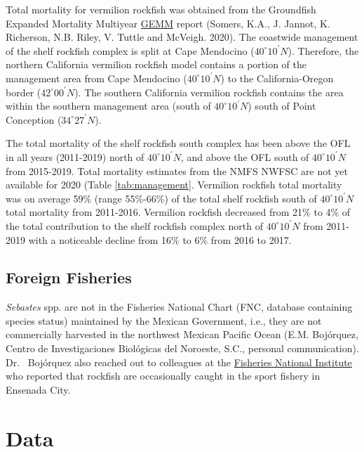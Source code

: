 \documentclass[
  english,
  a4paper,
]{article}
\begin{document}
Total mortality for vermilion rockfish was obtained from the Groundfish Expanded Mortality
Multiyear \href{https://www.nwfsc.noaa.gov/data/api/v1/source/observer.gemm_fact/selection.xlsx}{GEMM}
report (Somers, K.A., J. Jannot, K. Richerson, N.B. Riley, V. Tuttle and McVeigh. 2020). The coastwide management of the shelf rockfish complex is split at Cape
Mendocino ($40^\circ 10^\prime N$). Therefore, the northern California vermilion rockfish
model contains a portion of the management area from Cape Mendocino ($40^\circ 10^\prime N$)
to the California-Oregon border ($42^\circ 00^\prime N$). The southern California vermilion rockfish contains the
area within the southern management area (south of $40^\circ 10^\prime N$) south of Point Conception ($34^\circ 27^\prime N$).

The total mortality of the shelf rockfish
south complex has been above the OFL in all years (2011-2019) north of $40^\circ 10^\prime N$, and
above the OFL south of $40^\circ 10^\prime N$ from 2015-2019. Total mortality
estimates from the NMFS NWFSC are not yet available for 2020 (Table \ref{tab:management}. Vermilion rockfish total
mortality was on average 59\% (range 55\%-66\%) of the total shelf rockfish south
of $40^\circ 10^\prime N$ total mortality from 2011-2016. Vermilion rockfish decreased from 21\% to 4\% of
the total contribution to the shelf rockfish complex north of $40^\circ 10^\prime N$ from 2011-2019 with a
noticeable decline from 16\% to 6\% from 2016 to 2017.

\hypertarget{foreign-fisheries}{%
\subsection{Foreign Fisheries}\label{foreign-fisheries}}

\emph{Sebastes} spp. are not in the Fisheries National Chart (FNC, database containing
species status) maintained by the Mexican Government, i.e., they are not commercially
harvested in the northwest Mexican Pacific Ocean (E.M. Bojórquez, Centro de
Investigaciones Biológicas del Noroeste, S.C., personal communication). Dr.~
Bojórquez also reached out to colleagues at the
\href{https://www.gob.mx/inapesca}{Fisheries National Institute} who reported that rockfish
are occasionally caught in the sport fishery in Ensenada City.

\hypertarget{data}{%
\section{Data}\label{data}}
\end{document}
